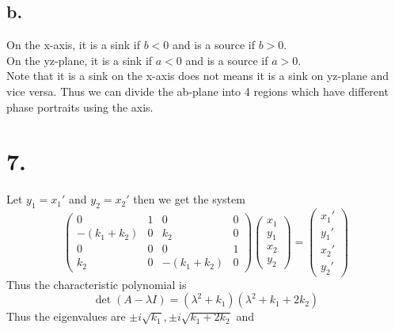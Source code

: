 \documentclass[11pt]{article}
\theoremstyle{mystyle}
\theoremstyle{definition}
\begin{document}
\subsection*{b.}
On the x-axis, it is a sink if $b < 0$ and is a source if $b>0$.  \\
On the yz-plane, it is a sink if $a <0$ and is a source if $a > 0$. \\
Note that it is a sink on the x-axis does not means it is a sink on yz-plane and vice versa. Thus we can divide the ab-plane into 4 regions which have different phase portraits using the axis. 
\clearpage
\section*{7.}
Let $y_1 = x_1'$ and $y_2 = x_2'$ then we get the system 
\[
  \begin{pmatrix}
    0 & 1 & 0 & 0\\
    -(k_1 + k_2) & 0 & k_2 & 0\\
    0 & 0 & 0 & 1 \\
    k_2 & 0 & -(k_1 + k_2) & 0
  \end{pmatrix}
  \begin{pmatrix}
    x_1 \\
    y_1 \\
    x_2 \\
    y_2
  \end{pmatrix}
  = 
  \begin{pmatrix}
    x_1' \\
    y_1' \\
    x_2' \\
    y_2'
  \end{pmatrix} 
\]
Thus the characteristic polynomial is 
\[
  \det(A - \lambda I) = (\lambda^2+k_1)(\lambda^2 + k_1+2k_2) 
\]
Thus the eigenvalues are $\pm i\sqrt{k_1}, \pm i\sqrt{k_1 + 2k_2}$ and 
\end{document}
